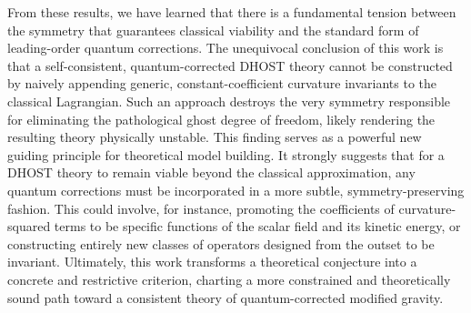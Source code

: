 \documentclass[twocolumn]{aastex631}
\begin{document}
From these results, we have learned that there is a fundamental tension between the symmetry that guarantees classical viability and the standard form of leading-order quantum corrections. The unequivocal conclusion of this work is that a self-consistent, quantum-corrected DHOST theory cannot be constructed by naively appending generic, constant-coefficient curvature invariants to the classical Lagrangian. Such an approach destroys the very symmetry responsible for eliminating the pathological ghost degree of freedom, likely rendering the resulting theory physically unstable. This finding serves as a powerful new guiding principle for theoretical model building. It strongly suggests that for a DHOST theory to remain viable beyond the classical approximation, any quantum corrections must be incorporated in a more subtle, symmetry-preserving fashion. This could involve, for instance, promoting the coefficients of curvature-squared terms to be specific functions of the scalar field and its kinetic energy, or constructing entirely new classes of operators designed from the outset to be invariant. Ultimately, this work transforms a theoretical conjecture into a concrete and restrictive criterion, charting a more constrained and theoretically sound path toward a consistent theory of quantum-corrected modified gravity.
\end{document}
